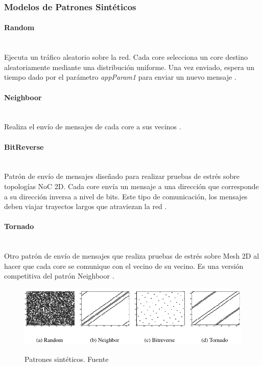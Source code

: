 \subsubsection{Modelos de Patrones Sintéticos}
\label{sss:synthetic}

\paragraph{Random}~\\
Ejecuta un tráfico aleatorio sobre la red. Cada core selecciona un core destino aleatoriamente
mediante una distribución uniforme. Una vez enviado, espera un tiempo dado por el parámetro
\textit{appParam1} para enviar un nuevo mensaje \cite{Manual}.

\paragraph{Neighboor}~\\
Realiza el envío de mensajes de cada core a sus vecinos \cite{hendry2009analysis}.

\paragraph{BitReverse}~\\
Patrón de envío de mensajes diseñado para realizar pruebas de estrés sobre topologías NoC 2D.
Cada core envía un mensaje a una dirección que corresponde a su dirección inversa a nivel de
bits. Este tipo de comunicación, los mensajes deben viajar trayectos largos que atraviezan la 
red \cite{hendry2009analysis}.

\paragraph{Tornado} ~\\
Otro patrón de envío de mensajes que realiza pruebas de estrés sobre Mesh 2D al hacer que
cada core se comunique con el vecino de su vecino. Es una versión competitiva del patrón
Neighboor \cite{hendry2009analysis}.

\begin{figure}[H]
\caption{Patrones sintéticos. Fuente \cite{hendry2009analysis}}
\centering
\includegraphics[width=1.0\textwidth,natwidth=787,natheight=205]{figs/syntbench.png}
\label{fig:synthbench}
\end{figure} 

